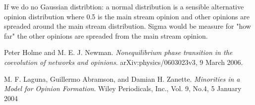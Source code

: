 \documentclass[11pt]{article}
\begin{document}
If we do no Gaussian distribtion: a normal distribution is a sensible alternative opinion distribution where 0.5 is the main stream opinion and other opinions are spreaded around the main stream distribution. Sigma would be measure for "how far" the other opinions are spreaded from the main stream opinion.


\begin{thebibliography}{99}
 Peter Holme and M. E. J. Newman. \textit{Nonequilibrium phase transition in the coevolution of networks and opinions}. arXiv:physics/0603023v3, 9 March 2006.

 M. F. Laguna, Guillermo Abramson, and Damian H. Zanette. \textit{Minorities in a Model for Opinion Formation}. Wiley Periodicals, Inc., Vol. 9, No.4, 5 January 2004

\end{thebibliography} 
\end{document}
